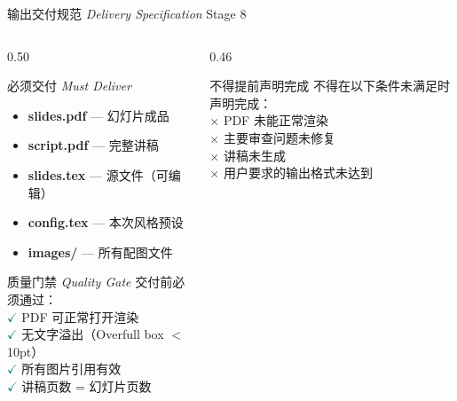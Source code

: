 \documentclass[aspectratio=169,10pt]{beamer}
\newcommand{\EN}[1]{\textit{#1}}
\newcommand{\sectag}[1]{\textmd{\small\normalfont\textcolor{deepblue!60}{#1}}}
\begin{document}
\begin{frame}{输出交付规范 \EN{Delivery Specification} \sectag{Stage 8}}
  \begin{columns}[T]
    \begin{column}{0.50\textwidth}
      \begin{block}{\small 必须交付 \EN{Must Deliver}}
        \footnotesize
        \begin{itemize}
          \item[\textcolor{teal}{$\checkmark$}] \textbf{slides.pdf} — 幻灯片成品
          \item[\textcolor{teal}{$\checkmark$}] \textbf{script.pdf} — 完整讲稿
          \item[\textcolor{teal}{$\checkmark$}] \textbf{slides.tex} — 源文件（可编辑）
          \item[\textcolor{teal}{$\checkmark$}] \textbf{config.tex} — 本次风格预设
          \item[\textcolor{teal}{$\checkmark$}] \textbf{images/} — 所有配图文件
        \end{itemize}
      \end{block}
      \vspace{4pt}
      \begin{exampleblock}{\small 质量门禁 \EN{Quality Gate}}
        \footnotesize
        交付前必须通过：\\
        \textcolor{teal}{$\checkmark$} PDF 可正常打开渲染\\
        \textcolor{teal}{$\checkmark$} 无文字溢出（Overfull box $<$ 10pt）\\
        \textcolor{teal}{$\checkmark$} 所有图片引用有效\\
        \textcolor{teal}{$\checkmark$} 讲稿页数 = 幻灯片页数
      \end{exampleblock}
    \end{column}
    \begin{column}{0.46\textwidth}
      \begin{alertblock}{\small 不得提前声明完成}
        \footnotesize
        \alert{不得在以下条件未满足时声明完成：}\\[4pt]
        $\times$ PDF 未能正常渲染\\
        $\times$ 主要审查问题未修复\\
        $\times$ 讲稿未生成\\
        $\times$ 用户要求的输出格式未达到\\[4pt]

\end{alertblock}
\end{column}
\end{columns}
\end{frame}
\end{document}
